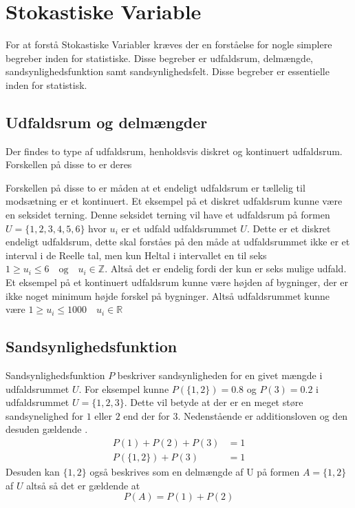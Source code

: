 \documentclass[../../SRP.tex]{subfiles}
\begin{document}
\chapter{Stokastiske Variable}

For at forstå Stokastiske Variabler kræves der en forståelse for nogle simplere begreber inden for statistiske. Disse begreber er udfaldsrum, delmængde, sandsynlighedsfunktion samt sandsynlighedsfelt. Disse begreber er essentielle inden for statistisk.

\section{Udfaldsrum og delmængder}

Der findes to type af udfaldsrum, henholdsvis diskret og kontinuert udfaldsrum. Forskellen på disse to er deres 

Forskellen på disse to er måden at et endeligt udfaldsrum er tællelig til modsætning er et kontinuert. Et eksempel på et diskret udfaldsrum kunne være en seksidet terning. Denne seksidet terning vil have et udfaldsrum på formen $U = \{1,2,3,4,5,6\}$ hvor $u_i$ er et udfald udfaldsrummet $U$. Dette er et diskret endeligt udfaldsrum, dette skal forståes på den måde at udfaldsrummet ikke er et interval i de Reelle tal, men kun Heltal i intervallet en til seks $1 \geq u_i \leq 6 \quad \textrm{og} \quad u_i \in \mathbb{Z}$. Altså det er endelig fordi der kun er seks mulige udfald. Et eksempel på et kontinuert udfaldsrum kunne være højden af bygninger, der er ikke noget minimum højde forskel på bygninger. Altså udfaldsrummet kunne være $1 \geq u_i \leq 1000 \quad u_i \in \mathbb{R}$

\section{Sandsynlighedsfunktion}

Sandsynlighedsfunktion $P$ beskriver sandsynligheden for en givet mængde i udfaldsrummet $U$. For eksempel kunne $P(\{1,2\}) = 0.8$ og $P(3) = 0.2$ i udfaldsrummet $U = \{1,2,3\}$. Dette vil betyde at der er en meget støre sandsynelighed for $1$ eller $2$ end der for $3$. Nedenstående er additionsloven og den desuden gældende \cite{SC}.
\begin{align}
  P(1) + P(2) + P(3) &= 1 \\
  P(\{1,2\}) + P(3) &= 1
\end{align}
Desuden kan $\{1,2\}$ også beskrives som en delmængde af U på formen $A = \{1,2\}$ af $U$ altså så det er gældende at
\begin{equation}
  P(A) = P(1) + P(2)
\end{equation}
\end{document}

